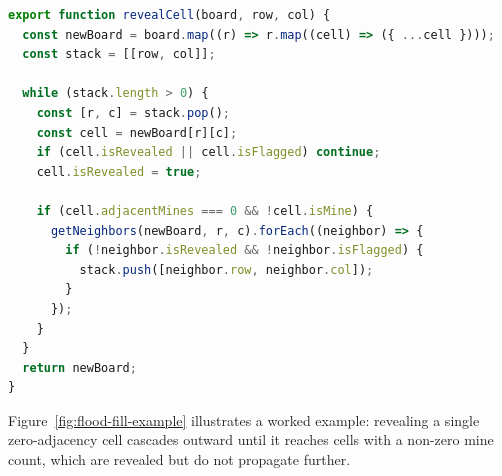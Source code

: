 \begin{lstlisting}[language=JavaScript, caption={Iterative flood-fill reveal (\texttt{minesweeper.js}).}, label={lst:flood-fill}]
export function revealCell(board, row, col) {
  const newBoard = board.map((r) => r.map((cell) => ({ ...cell })));
  const stack = [[row, col]];

  while (stack.length > 0) {
    const [r, c] = stack.pop();
    const cell = newBoard[r][c];
    if (cell.isRevealed || cell.isFlagged) continue;
    cell.isRevealed = true;

    if (cell.adjacentMines === 0 && !cell.isMine) {
      getNeighbors(newBoard, r, c).forEach((neighbor) => {
        if (!neighbor.isRevealed && !neighbor.isFlagged) {
          stack.push([neighbor.row, neighbor.col]);
        }
      });
    }
  }
  return newBoard;
}
\end{lstlisting}

Figure~\ref{fig:flood-fill-example} illustrates a worked example: revealing
a single zero-adjacency cell cascades outward until it reaches cells with a
non-zero mine count, which are revealed but do not propagate further.

